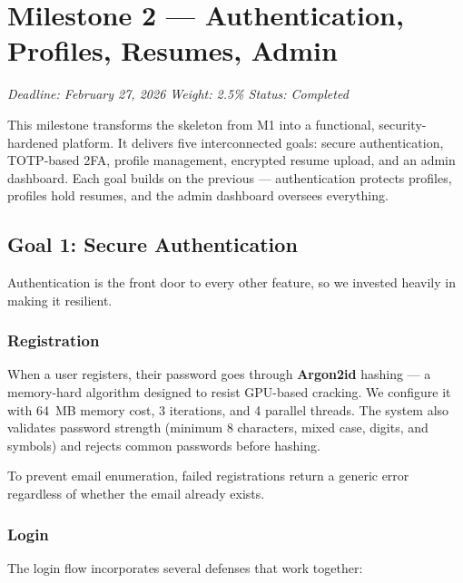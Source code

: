 
\section{Milestone 2 — Authentication, Profiles, Resumes, Admin}
\label{sec:milestone2}

\textit{Deadline: February 27, 2026 \quad Weight: 2.5\% \quad Status: Completed}

\medskip

This milestone transforms the skeleton from M1 into a functional, security-hardened platform. It delivers five interconnected goals: secure authentication, TOTP-based 2FA, profile management, encrypted resume upload, and an admin dashboard. Each goal builds on the previous — authentication protects profiles, profiles hold resumes, and the admin dashboard oversees everything.

\subsection{Goal 1: Secure Authentication}

Authentication is the front door to every other feature, so we invested heavily in making it resilient.

\subsubsection{Registration}

When a user registers, their password goes through \textbf{Argon2id} hashing — a memory-hard algorithm designed to resist GPU-based cracking. We configure it with 64~MB memory cost, 3 iterations, and 4 parallel threads. The system also validates password strength (minimum 8 characters, mixed case, digits, and symbols) and rejects common passwords before hashing.

To prevent email enumeration, failed registrations return a generic error regardless of whether the email already exists.

\subsubsection{Login}

The login flow incorporates several defenses that work together:

